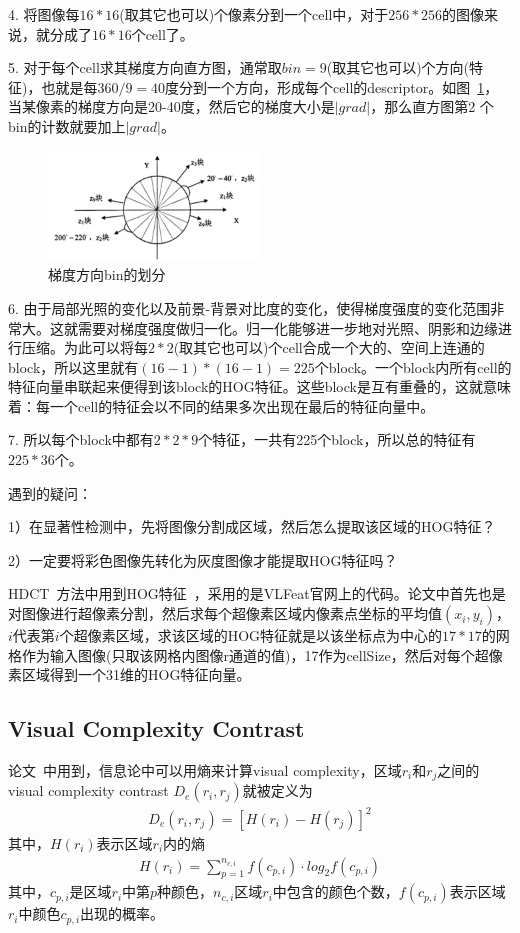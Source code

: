 \documentclass[12pt]{article}
\begin{document}
4. 将图像每$16*16$(取其它也可以)个像素分到一个cell中，对于$256*256$的图像来说，就分成了$16*16$个cell了。

5. 对于每个cell求其梯度方向直方图，通常取$bin = 9$(取其它也可以)个方向(特征)，也就是每$360/9 = 40$度分到一个方向，形成每个cell的descriptor。如图~\ref{fig: 方向梯度}，当某像素的梯度方向是20-40度，然后它的梯度大小是$|grad|$，那么直方图第2
个bin的计数就要加上$|grad|$。

\begin{figure}[!ht]
\centering
\includegraphics[width=0.5\textwidth]{方向梯度.png}
\caption{梯度方向bin的划分}
\label{fig: 方向梯度}
\end{figure} 

6. 由于局部光照的变化以及前景-背景对比度的变化，使得梯度强度的变化范围非常大。这就需要对梯度强度做归一化。归一化能够进一步地对光照、阴影和边缘进行压缩。为此可以将每$2*2$(取其它也可以)个cell合成一个大的、空间上连通的block，所以这里就有$(16-1)*(16-1) = 225$个block。一个block内所有cell的特征向量串联起来便得到该block的HOG特征。这些block是互有重叠的，这就意味着：每一个cell的特征会以不同的结果多次出现在最后的特征向量中。

7. 所以每个block中都有$2*2*9$个特征，一共有225个block，所以总的特征有$225*36$个。

遇到的疑问：

1）在显著性检测中，先将图像分割成区域，然后怎么提取该区域的HOG特征？

2）一定要将彩色图像先转化为灰度图像才能提取HOG特征吗？

HDCT~\cite{kim2014salient}方法中用到HOG特征~\cite{felzenszwalb2010object}，采用的是VLFeat官网上的代码。论文中首先也是对图像进行超像素分割，然后求每个超像素区域内像素点坐标的平均值$(x_i, y_i)$，$i$代表第$i$个超像素区域，求该区域的HOG特征就是以该坐标点为中心的$17*17$的网格作为输入图像(只取该网格内图像r通道的值)，17作为cellSize，然后对每个超像素区域得到一个31维的HOG特征向量。

\subsection{Visual Complexity Contrast}

论文~\cite{zhu2014tag}中用到，信息论中可以用熵来计算visual complexity，区域$r_i$和$r_j$之间的visual complexity contrast $D_e(r_i, r_j)$就被定义为
\begin{align}
D_e(r_i, r_j) = [H(r_i)-H(r_j)]^2
\end{align}
其中，$H(r_i)$表示区域$r_i$内的熵
\begin{align}
H(r_i) = \sum_{p=1}^{n_{c, i}}f(c_{p, i})\cdot log_2f(c_{p, i})
\end{align}
其中，$c_{p, i}$是区域$r_i$中第$p$种颜色，$n_{c, i}$区域$r_i$中包含的颜色个数，$f(c_{p, i})$表示区域$r_i$中颜色$c_{p, i}$出现的概率。
\end{document}
